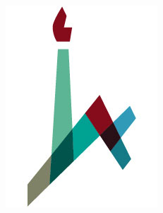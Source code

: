 \documentclass[extrafontsizes,60pt,twocolumn]{memoir}
\begin{document}
\begin{strip}
\begin{center}
\begin{minipage}[b]{.05\linewidth}
    \includegraphics[width=\linewidth]{huji_logo.jpg}
    \vspace{-2.5in}
  \end{minipage}
  \end{center}
\end{strip}

\end{document}

